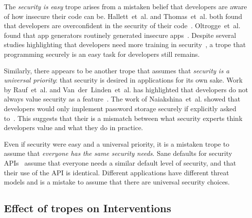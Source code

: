 \documentclass[conference]{IEEEtran}
\newcommand{\etal}[0]{et~al{.}}
\begin{document}
The \emph{security is easy} trope arises from a mistaken belief that developers are aware of how insecure their code can be.  Hallett~\etal{} and Thomas~\etal{} both found that developers are overconfident in the security of their code~\cite{joseph2021,thomas2018}. Oltrogge~\etal{} found that app generators routinely generated insecure apps~\cite{oltrogge2018rise}.  Despite several studies highlighting that developers need more training in security~\cite{thomas2018,emmasurface2020}, a trope that programming securely is an easy task for developers still remains.

Similarly, there appears to be another trope that assumes that \emph{security is a universal priority}: that security is desired in applications for its own sake.  Work by Rauf~\etal{} and Van~der~Linden~\etal{} has highlighted that developers do not always value security as a feature~\cite{linden2019,linden2020,irum2020}. The work of Naiakshina~\etal{} showed that developers would only implement password storage securely if explicitly asked to~\cite{naiakshina2019}.  This suggests that their is a mismatch between what security experts think developers value and what they do in practice.

Even if security were easy and a universal priority, it is a mistaken trope to assume that \emph{everyone has the same security needs}.  Sane defaults for security APIs~\cite{smithgreen2016} assume that everyone needs a similar default level of security, and that their use of the API is identical.  Different applications have different threat models and is a mistake to assume that there are universal security choices.

\subsection{Effect of tropes on Interventions}  
\end{document}

